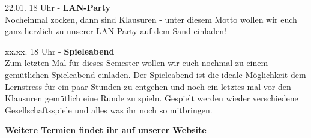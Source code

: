 \large 22.01. 18 Uhr - \textbf{LAN-Party}\\
\normalsize
Nocheinmal zocken, dann sind Klausuren - unter diesem Motto wollen wir euch ganz herzlich zu unserer LAN-Party auf dem Sand einladen!\\

\large xx.xx. 18 Uhr - \textbf{Spieleabend}\\
\normalsize
Zum letzten Mal für dieses Semester wollen wir euch nochmal zu einem gemütlichen Spieleabend einladen. Der Spieleabend ist die ideale Möglichkeit dem Lernstress für ein paar Stunden zu entgehen und noch ein letztes mal vor den Klausuren gemütlich eine Runde zu spieln. Gespielt werden wieder verschiedene Gesellschaftsspiele und alles was ihr noch so mitbringen.

\large \textbf{Weitere Termien findet ihr auf unserer Website}